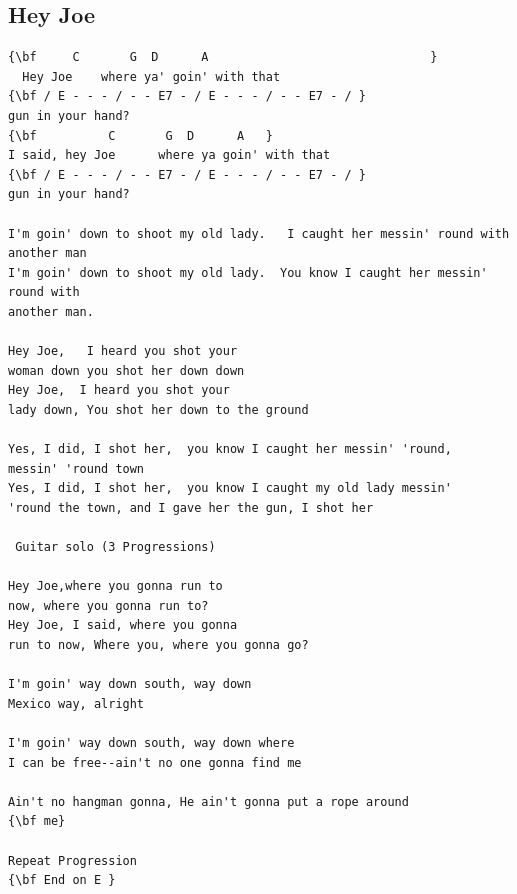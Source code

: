 \documentclass[a4paper]{article}
\begin{document}
\subsection{Hey Joe}
\begin{Verbatim}[commandchars=\\\{\}]
{\bf     C       G  D      A                               }
  Hey Joe    where ya' goin' with that  
{\bf / E - - - / - - E7 - / E - - - / - - E7 - / }
gun in your hand? 
{\bf          C       G  D      A   }
I said, hey Joe      where ya goin' with that  
{\bf / E - - - / - - E7 - / E - - - / - - E7 - / }
gun in your hand?  

I'm goin' down to shoot my old lady.   I caught her messin' round with  
another man  
I'm goin' down to shoot my old lady.  You know I caught her messin' round with  
another man. 

Hey Joe,   I heard you shot your 
woman down you shot her down down 
Hey Joe,  I heard you shot your  
lady down, You shot her down to the ground 

Yes, I did, I shot her,  you know I caught her messin' 'round,  
messin' 'round town 
Yes, I did, I shot her,  you know I caught my old lady messin'  
'round the town, and I gave her the gun, I shot her 

 Guitar solo (3 Progressions) 

Hey Joe,where you gonna run to  
now, where you gonna run to? 
Hey Joe, I said, where you gonna  
run to now, Where you, where you gonna go? 

I'm goin' way down south, way down  
Mexico way, alright 

I'm goin' way down south, way down where  
I can be free--ain't no one gonna find me 

Ain't no hangman gonna, He ain't gonna put a rope around  
{\bf me}

Repeat Progression 
{\bf End on E }

\end{Verbatim}
\newpage
\end{document}
